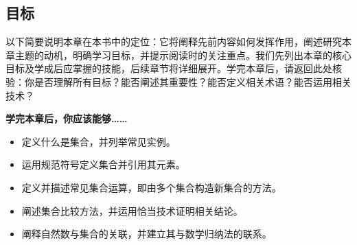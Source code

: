 \subsection{目标}

以下简要说明本章在本书中的定位：它将阐释先前内容如何发挥作用，阐述研究本章主题的动机，明确学习目标，并提示阅读时的关注重点。我们先列出本章的核心目标及学成后应掌握的技能，后续章节将详细展开。学完本章后，请返回此处核验：你是否理解所有目标？能否阐述其重要性？能否定义相关术语？能否运用相关技术？

\textbf{学完本章后，你应该能够……}

\begin{itemize}
    \item 定义什么是集合，并列举常见实例。
    \item 运用规范符号定义集合并引用其元素。
    \item 定义并描述常见集合运算，即由多个集合构造新集合的方法。
    \item 阐述集合比较方法，并运用恰当技术证明相关结论。
    \item 阐释自然数与集合的关联，并建立其与数学归纳法的联系。
\end{itemize}
